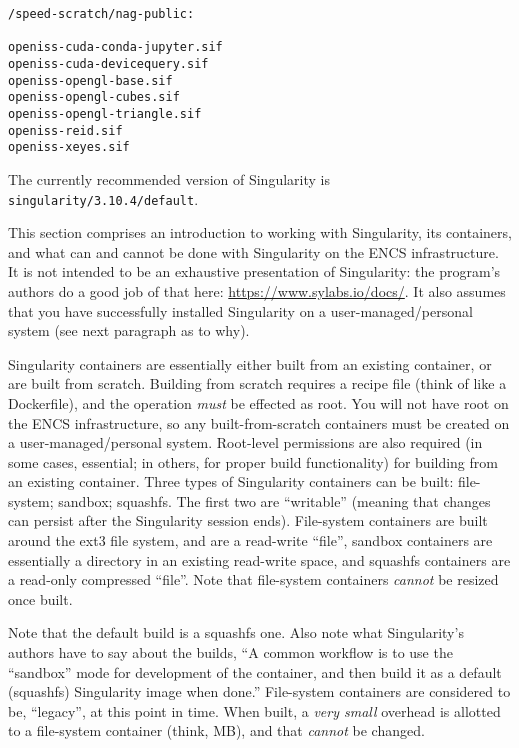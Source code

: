 \begin{verbatim}
/speed-scratch/nag-public:

openiss-cuda-conda-jupyter.sif
openiss-cuda-devicequery.sif
openiss-opengl-base.sif
openiss-opengl-cubes.sif
openiss-opengl-triangle.sif
openiss-reid.sif
openiss-xeyes.sif
\end{verbatim}

The currently recommended version of Singularity is
\texttt{singularity/3.10.4/default}.

This section comprises an introduction to working with Singularity, its 
containers, and what can and cannot be done with Singularity on the ENCS 
infrastructure. It is not intended to be an exhaustive presentation of 
Singularity: the program's authors do a good job of that here:
\url{https://www.sylabs.io/docs/}. It also assumes that you have successfully installed 
Singularity on a user-managed/personal system (see next paragraph as to why).

Singularity containers are essentially either built from an existing 
container, or are built from scratch. Building from scratch requires a recipe 
file (think of like a Dockerfile), and the operation \emph{must} be effected as root.
You will not have root on the ENCS infrastructure, so any built-from-scratch containers must be created 
on a user-managed/personal system. Root-level permissions are also required
(in some cases, essential; in others, for proper build functionality) for 
building from an existing container.
%
Three types of Singularity containers can be built: file-system; sandbox; 
squashfs. The first two are ``writable'' (meaning that changes can persist 
after the Singularity session ends). File-system containers are built around 
the ext3 file system, and are a read-write ``file'', sandbox containers are 
essentially a directory in an existing read-write space, and squashfs 
containers are a read-only compressed ``file''. Note that file-system 
containers \emph{cannot} be resized once built.

Note that the default build is a squashfs one. Also note what Singularity's 
authors have to say about the builds, ``A common workflow is to use the 
``sandbox'' mode for development of the container, and then build it as a 
default (squashfs) Singularity image when done.'' File-system containers are 
considered to be, ``legacy'', at this point in time. When built, a \emph{very small}
overhead is allotted to a file-system container (think, MB), and that 
\emph{cannot} be changed.

